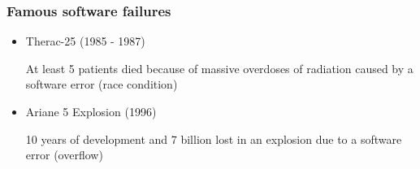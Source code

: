 \documentclass[../ESOF_notes.tex]{subfiles}
\begin{document}
\subsubsection{Famous software failures}
\begin{itemize}
    \item Therac-25 (1985 - 1987)

          At least 5 patients died because of massive overdoses of
          radiation caused by a software error (race condition)


    \item Ariane 5 Explosion (1996)

          10 years of development and 7 billion lost in an
          explosion due to a software error (overflow)
\end{itemize}
\end{document}
